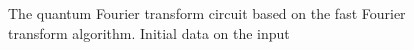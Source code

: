 \begin{figure}
\centering



\caption{The quantum Fourier transform circuit based on the fast
  Fourier transform algorithm. Initial data on the input}
\label{figQuantCompQuantFourier0}
\end{figure}
